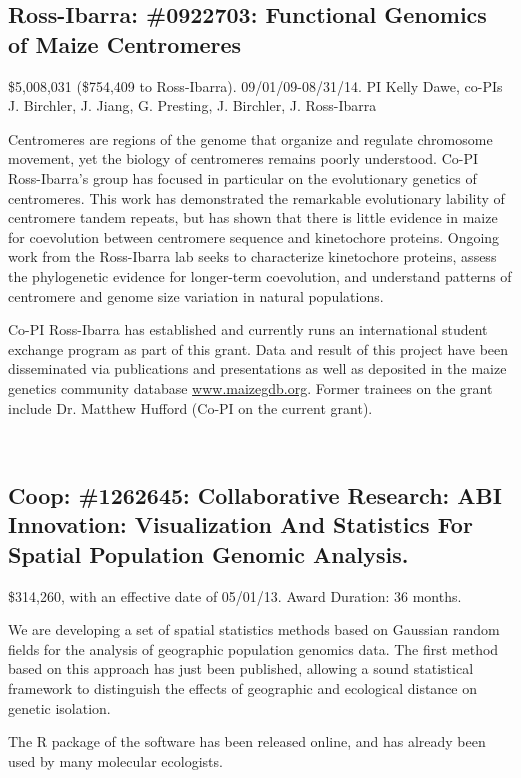 \subsection*{Ross-Ibarra: \#0922703: Functional Genomics of Maize Centromeres}
\$5,008,031 (\$754,409 to Ross-Ibarra). 09/01/09-08/31/14. PI Kelly Dawe, co-PIs J. Birchler, J. Jiang, G. Presting, J. Birchler, J. Ross-Ibarra
\par{} Centromeres are regions of the genome that organize and regulate chromosome movement, yet the biology of centromeres remains poorly understood. Co-PI Ross-Ibarra's group has focused in particular on the evolutionary genetics of centromeres. This work has demonstrated the remarkable evolutionary lability of centromere tandem repeats, but has shown that there is little evidence in maize for coevolution between centromere sequence and kinetochore proteins. Ongoing work from the Ross-Ibarra lab seeks to characterize kinetochore proteins, assess the phylogenetic evidence for longer-term coevolution, and understand patterns of centromere and genome size variation in natural populations.
\par{}  Co-PI Ross-Ibarra has established and currently runs an international student exchange program as part of this grant. Data and result of this project have been disseminated via publications and presentations as well as deposited in the maize genetics community database \url{www.maizegdb.org}. Former trainees on the grant include Dr. Matthew Hufford (Co-PI on the current grant). 
\par{} \citet{Shi2010a, Chia2012a, Fang2012a, Hufford2012, Hufford2012b, Hufford2013, Melters2013a, Kanizay2013, Pyhajarvi2013}

\subsection*{Coop: \#1262645: Collaborative Research: ABI Innovation: Visualization And Statistics For Spatial Population Genomic Analysis. }
\$314,260, with an effective date of 05/01/13. Award Duration: 36 months.
\par{} We are developing a set of spatial statistics methods based on Gaussian random fields for the analysis of geographic population genomics data. The first method based on this approach has just been published, allowing a sound statistical framework to distinguish the effects of geographic and ecological distance on genetic isolation. 
\par{}  The R package of the software has been released online, and has already been used by many molecular ecologists. 
\par{} \citet{bradburd2013}

